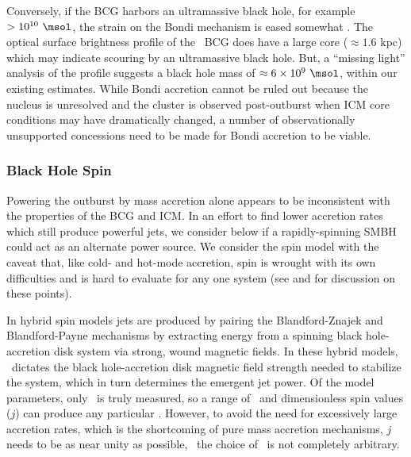 \documentclass[iop]{emulateapj-rtx4}
\begin{document}
Conversely, if the BCG harbors an ultramassive black hole, for example
$> 10^{10} ~\msol$, the strain on the Bondi mechanism is eased
somewhat \citep[\eg][]{msspin}. The optical surface brightness profile
of the \rbs\ BCG does have a large core ($\approx 1.6$ kpc) which may
indicate scouring by an ultramassive black hole. But, a ``missing
light'' analysis \citep[see][]{msspin} of the profile suggests a black
hole mass of $\approx 6 \times 10^9 ~\msol$, within our existing
estimates. While Bondi accretion cannot be ruled out because the
nucleus is unresolved and the cluster is observed post-outburst when
ICM core conditions may have dramatically changed, a number of
observationally unsupported concessions need to be made for Bondi
accretion to be viable.

\subsubsection{Black Hole Spin}

Powering the outburst by mass accretion alone appears to be
inconsistent with the properties of the BCG and ICM. In an effort to
find lower accretion rates which still produce powerful jets, we
consider below if a rapidly-spinning SMBH could act as an alternate
power source. We consider the spin model with the caveat that, like
cold- and hot-mode accretion, spin is wrought with its own
difficulties and is hard to evaluate for any one system (see
\citealt{msspin} and \citealt{minaspin} for discussion on these
points).

In hybrid spin models \citep[\eg][]{1999ApJ...522..753M,
  2001ApJ...548L...9M, 2006ApJ...651.1023R, 2007MNRAS.377.1652N,
  2009MNRAS.397.1302B, gesspin} jets are produced by pairing the
Blandford-Znajek \citep{bz} and Blandford-Payne \citep{bp} mechanisms
by extracting energy from a spinning black hole-accretion disk system
via strong, wound magnetic fields. In these hybrid models,
\dme\ dictates the black hole-accretion disk magnetic field strength
needed to stabilize the system, which in turn determines the emergent
jet power. Of the model parameters, only \pjet\ is truly measured, so
a range of \dme\ and dimensionless spin values ($j$) can produce any
particular \pjet. However, to avoid the need for excessively large
accretion rates, which is the shortcoming of pure mass accretion
mechanisms, $j$ needs to be as near unity as possible, \ie\ the choice
of \dme\ is not completely arbitrary.
\end{document}
